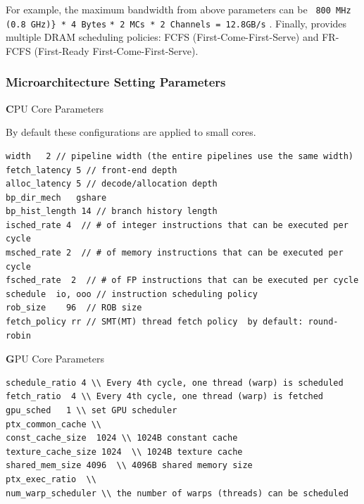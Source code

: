 For example, the maximum bandwidth from above parameters can be
\Verb+ 800 MHz (0.8 GHz)} * 4 Bytes+
  \Verb+* 2 MCs * 2 Channels = 12.8GB/s+ . Finally, \SIM provides
  multiple DRAM scheduling policies: FCFS (First-Come-First-Serve) and
  FR-FCFS (First-Ready First-Come-First-Serve).


\subsubsection{Microarchitecture Setting Parameters}

\noindent 
{\textbf CPU Core Parameters} 

By default these configurations are applied to small cores. 

\begin{Verbatim}
width   2 // pipeline width (the entire pipelines use the same width) 
fetch_latency 5 // front-end depth 
alloc_latency 5 // decode/allocation depth  
bp_dir_mech   gshare 
bp_hist_length 14 // branch history length 
isched_rate 4  // # of integer instructions that can be executed per cycle 
msched_rate 2  // # of memory instructions that can be executed per cycle 
fsched_rate  2  // # of FP instructions that can be executed per cycle 
schedule  io, ooo // instruction scheduling policy 
rob_size    96  // ROB size
fetch_policy rr // SMT(MT) thread fetch policy  by default: round-robin 
\end{Verbatim}

\noindent  
{\textbf GPU Core Parameters} 


\smallskip
\begin{lstlisting}
schedule_ratio 4 \\ Every 4th cycle, one thread (warp) is scheduled 
fetch_ratio  4 \\ Every 4th cycle, one thread (warp) is fetched 
gpu_sched   1 \\ set GPU scheduler 
ptx_common_cache \\ 
const_cache_size  1024 \\ 1024B constant cache  
texture_cache_size 1024  \\ 1024B texture cache
shared_mem_size 4096  \\ 4096B shared memory size 
ptx_exec_ratio  \\ 
num_warp_scheduler \\ the number of warps (threads) can be scheduled  
\end{lstlisting}
\smallskip











